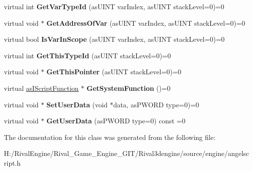 \begin{DoxyCompactItemize}
\item 
\mbox{\label{classas_i_script_context_a8684e1931e54dbfe53da763fc334413d}} 
virtual int {\bfseries Get\+Var\+Type\+Id} (as\+U\+I\+NT var\+Index, as\+U\+I\+NT stack\+Level=0)=0
\item 
\mbox{\label{classas_i_script_context_acc916505d79de321a2ab2b46b1c61fb7}} 
virtual void $\ast$ {\bfseries Get\+Address\+Of\+Var} (as\+U\+I\+NT var\+Index, as\+U\+I\+NT stack\+Level=0)=0
\item 
\mbox{\label{classas_i_script_context_a45fcf7d8d711d5ec5cb9927e7839387a}} 
virtual bool {\bfseries Is\+Var\+In\+Scope} (as\+U\+I\+NT var\+Index, as\+U\+I\+NT stack\+Level=0)=0
\item 
\mbox{\label{classas_i_script_context_a404681f8950c1ebd9382d30ef1ed3b89}} 
virtual int {\bfseries Get\+This\+Type\+Id} (as\+U\+I\+NT stack\+Level=0)=0
\item 
\mbox{\label{classas_i_script_context_a4f6761a7a0c872dda681d8e180830ff9}} 
virtual void $\ast$ {\bfseries Get\+This\+Pointer} (as\+U\+I\+NT stack\+Level=0)=0
\item 
\mbox{\label{classas_i_script_context_a214cc16c4dd889072c1c24c089223a6a}} 
virtual \hyperlink{classas_i_script_function}{as\+I\+Script\+Function} $\ast$ {\bfseries Get\+System\+Function} ()=0
\item 
\mbox{\label{classas_i_script_context_a263dc70abb2a8c77adcea7c9ede0a479}} 
virtual void $\ast$ {\bfseries Set\+User\+Data} (void $\ast$data, as\+P\+W\+O\+RD type=0)=0
\item 
\mbox{\label{classas_i_script_context_a0f8503675abfd473915d66a92c6e6df7}} 
virtual void $\ast$ {\bfseries Get\+User\+Data} (as\+P\+W\+O\+RD type=0) const =0
\end{DoxyCompactItemize}


The documentation for this class was generated from the following file\+:\begin{DoxyCompactItemize}
\item 
H\+:/\+Rival\+Engine/\+Rival\+\_\+\+Game\+\_\+\+Engine\+\_\+\+G\+I\+T/\+Rival3dengine/source/engine/angelscript.\+h\end{DoxyCompactItemize}
